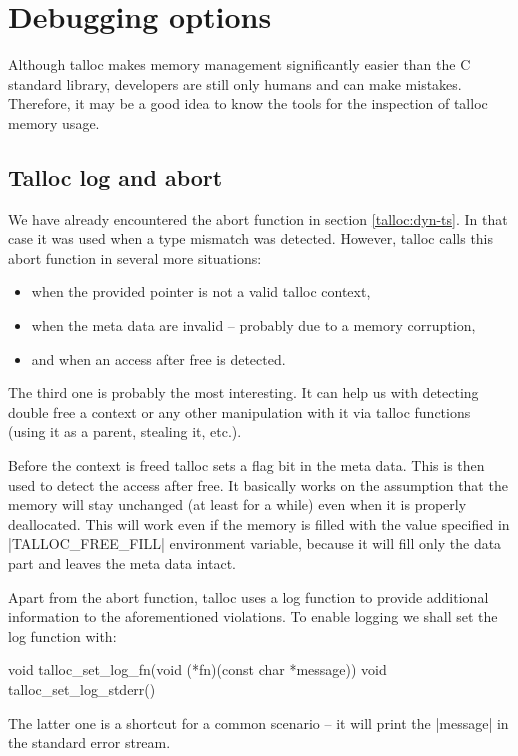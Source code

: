\section{Debugging options}
\label{talloc:sec:debugging}

Although talloc makes memory management significantly easier than the C standard
library, developers are still only humans and can make mistakes. Therefore, it
may be a good idea to know the tools for the inspection of talloc memory usage.

\subsection{Talloc log and abort}

We have already encountered the abort function in section \ref{talloc:dyn-ts}.
In that case it was used when a type mismatch was detected. However, talloc
calls this abort function in several more situations:

\begin{itemize}
  \item when the provided pointer is not a valid talloc context,
  \item when the meta data are invalid -- probably due to a memory corruption,
  \item and when an access after free is detected.
\end{itemize}

The third one is probably the most interesting. It can help us with detecting
double free a context or any other manipulation with it via talloc functions
(using it as a parent, stealing it, etc.).

Before the context is freed talloc sets a flag bit in the meta data. This is
then used to detect the access after free. It basically works on the assumption
that the memory will stay unchanged (at least for a while) even when it is
properly deallocated. This will work even if the memory is filled with the
value specified in |TALLOC_FREE_FILL| environment variable, because it will
fill only the data part and leaves the meta data intact.

Apart from the abort function, talloc uses a log function to provide additional
information to the aforementioned violations. To enable logging we shall set the
log function with:

\begin{funcproto}
void talloc_set_log_fn(void (*fn)(const char *message))
void talloc_set_log_stderr()
\end{funcproto}
\funclistend
The latter one is a shortcut for a common scenario -- it will print the
|message| in the standard error stream.

